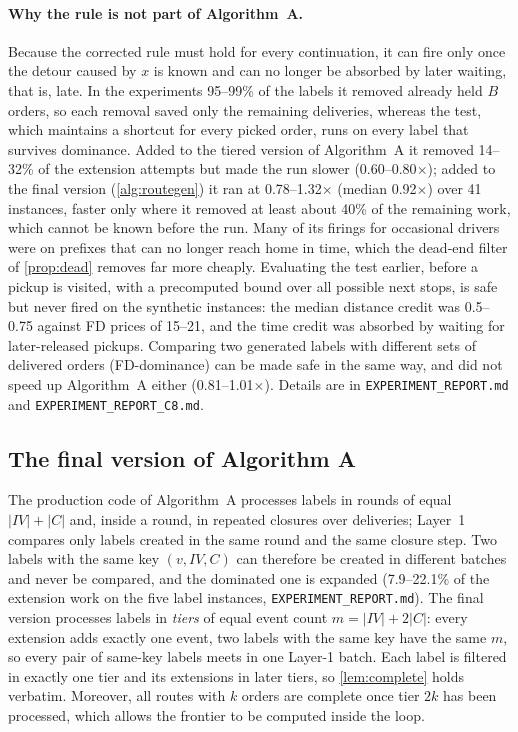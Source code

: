 \documentclass[11pt]{article}
\theoremstyle{definition}
\theoremstyle{remark}
\begin{document}
\paragraph{Why the rule is not part of Algorithm~A.} Because the corrected
rule must hold for every continuation, it can fire only once the detour caused
by $x$ is known and can no longer be absorbed by later waiting, that is, late.
In the experiments 95--99\% of the labels it removed already held $B$ orders,
so each removal saved only the remaining deliveries, whereas the test, which
maintains a shortcut for every picked order, runs on every label that survives
dominance. Added to the tiered version of Algorithm~A it removed 14--32\% of
the extension attempts but made the run slower (0.60--0.80$\times$); added to
the final version (\cref{alg:routegen}) it ran at 0.78--1.32$\times$ (median
0.92$\times$) over 41 instances, faster only where it removed at least about
40\% of the remaining work, which cannot be known before the run. Many of its
firings for occasional drivers were on prefixes that can no longer reach home
in time, which the dead-end filter of \cref{prop:dead} removes far more
cheaply. Evaluating the test earlier, before a pickup is visited, with a
precomputed bound over all possible next stops, is safe but never fired on the
synthetic instances: the median distance credit was 0.5--0.75 against FD
prices of 15--21, and the time credit was absorbed by waiting for
later-released pickups. Comparing two generated labels with different sets of
delivered orders (FD-dominance) can be made safe in the same way, and did not
speed up Algorithm~A either (0.81--1.01$\times$). Details are in
\texttt{EXPERIMENT\_REPORT.md} and \texttt{EXPERIMENT\_REPORT\_C8.md}.
\subsection{The final version of Algorithm A}
\label{sec:finalA}

The production code of Algorithm~A processes labels in rounds of equal
$|IV|+|C|$ and, inside a round, in repeated closures over deliveries; Layer~1
compares only labels created in the same round and the same closure step. Two
labels with the same key $(v,IV,C)$ can therefore be created in different
batches and never be compared, and the dominated one is expanded (7.9--22.1\%
of the extension work on the five label instances, \texttt{EXPERIMENT\_REPORT.md}).
The final version processes labels in \emph{tiers} of equal event count
$m=|IV|+2|C|$: every extension adds exactly one event, two labels with the same
key have the same $m$, so every pair of same-key labels meets in one Layer-1
batch. Each label is filtered in exactly one tier and its extensions in later
tiers, so \cref{lem:complete} holds verbatim. Moreover, all routes
with $k$ orders are complete once tier $2k$ has been processed, which allows the
frontier to be computed inside the loop.
\end{document}
